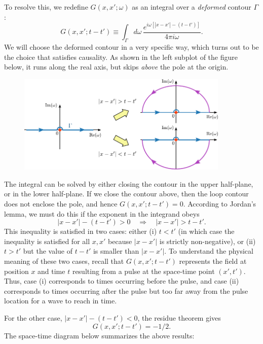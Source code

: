\documentclass[10pt,a4paper]{article}
\begin{document}
To resolve this, we redefine $G(x,x';\omega)$ as an integral over a
\emph{deformed} contour $\Gamma$:
\begin{equation}
G(x,x';t-t') \equiv \int_\Gamma d\omega \, \frac{e^{i\omega \left[|x-x'| - (t-t')\right]}}{4\pi i\omega}.
\end{equation}
We will choose the deformed contour in a very specific way, which
turns out to be the choice that satisfies causality.  As shown in the
left subplot of the figure below, it runs along the real axis, but
skips \emph{above} the pole at the origin.

\begin{figure}[ht]
  \centering\includegraphics[width=0.9\textwidth]{causality_contour}
\end{figure}

The integral can be solved by either closing the contour in the upper
half-plane, or in the lower half-plane. If we close the contour above,
then the loop contour does not enclose the pole, and hence
$G(x,x';t-t') = 0$. According to Jordan's lemma, we must do this if
the exponent in the integrand obeys
\begin{equation}
|x-x'| - (t-t') > 0  \quad \Rightarrow \quad |x-x'| > t-t'.
\end{equation}
This inequality is satisfied in two cases: either (i) $t < t'$ (in
which case the inequality is satisfied for all $x,x'$ because $|x-x'|$
is strictly non-negative), or (ii) $t > t'$ but the value of $t-t'$ is
smaller than $|x-x'|$. To understand the physical meaning of these two
cases, recall that $G(x,x';t-t')$ represents the field at position $x$
and time $t$ resulting from a pulse at the space-time point
$(x',t')$. Thus, case (i) corresponds to times occurring before the
pulse, and case (ii) corresponds to times occurring after the pulse
but too far away from the pulse location for a wave to reach in time.

For the other case, $|x-x'| - (t-t') < 0$, the residue theorem gives
\begin{equation}
  G(x,x';t-t') = -1/2.
\end{equation}
The space-time diagram below summarizes the above results:
\end{document}
